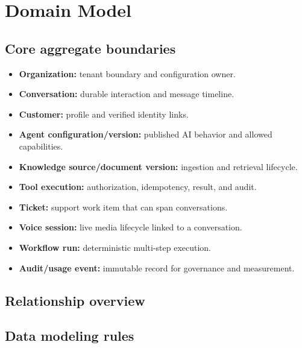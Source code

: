 \chapter{Domain Model}

\section{Core aggregate boundaries}

\begin{itemize}
\item \textbf{Organization:} tenant boundary and configuration owner.
\item \textbf{Conversation:} durable interaction and message timeline.
\item \textbf{Customer:} profile and verified identity links.
\item \textbf{Agent configuration/version:} published AI behavior and allowed capabilities.
\item \textbf{Knowledge source/document version:} ingestion and retrieval lifecycle.
\item \textbf{Tool execution:} authorization, idempotency, result, and audit.
\item \textbf{Ticket:} support work item that can span conversations.
\item \textbf{Voice session:} live media lifecycle linked to a conversation.
\item \textbf{Workflow run:} deterministic multi-step execution.
\item \textbf{Audit/usage event:} immutable record for governance and measurement.
\end{itemize}
\section{Relationship overview}

\section{Data modeling rules}

